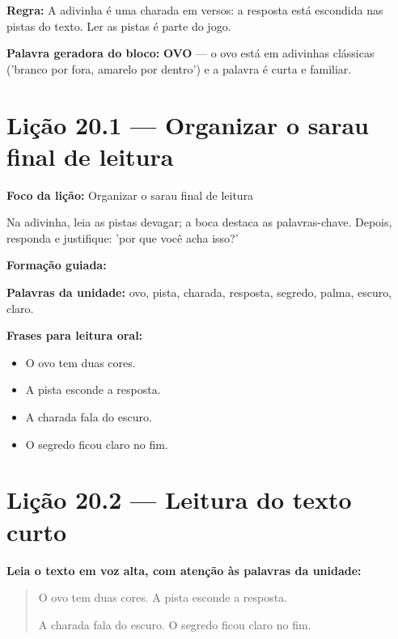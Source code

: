 \textbf{Regra:} A adivinha é uma charada em versos: a resposta está escondida nas pistas do texto. Ler as pistas é parte do jogo.

\textbf{Palavra geradora do bloco:} \textbf{OVO} --- o ovo está em adivinhas clássicas ('branco por fora, amarelo por dentro') e a palavra é curta e familiar.

\section{Lição 20.1 --- Organizar o sarau final de leitura}

\textbf{Foco da lição:} Organizar o sarau final de leitura


\begin{boquinha}
Na adivinha, leia as pistas devagar; a boca destaca as palavras-chave. Depois, responda e justifique: 'por que você acha isso?'
\end{boquinha}

\noindent\textbf{Formação guiada:}

\begin{center}
\end{center}

\noindent\textbf{Palavras da unidade:} ovo, pista, charada, resposta, segredo, palma, escuro, claro.

\noindent\textbf{Frases para leitura oral:}
\begin{itemize}[leftmargin=1.6em]
  \item O ovo tem duas cores.
  \item A pista esconde a resposta.
  \item A charada fala do escuro.
  \item O segredo ficou claro no fim.
\end{itemize}

\section{Lição 20.2 --- Leitura do texto curto}

\noindent\textbf{Leia o texto em voz alta, com atenção às palavras da unidade:}


\begin{quote}
O ovo tem duas cores. A pista esconde a resposta.

A charada fala do escuro. O segredo ficou claro no fim.
\end{quote}

